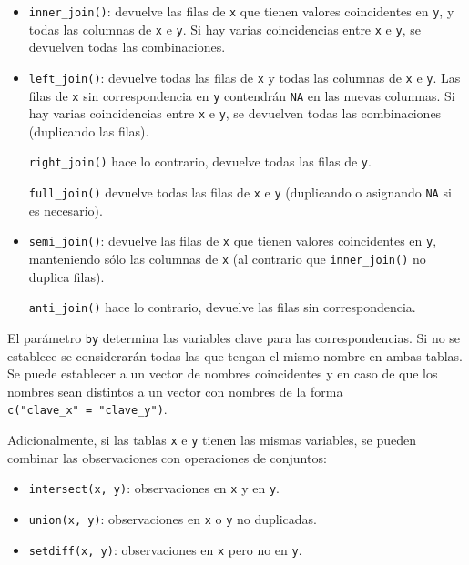 \documentclass[
]{book}
\begin{document}
\begin{itemize}
\item
  \texttt{inner\_join()}: devuelve las filas de \texttt{x} que tienen valores coincidentes en \texttt{y},
  y todas las columnas de \texttt{x} e \texttt{y}. Si hay varias coincidencias entre \texttt{x} e \texttt{y},
  se devuelven todas las combinaciones.
\item
  \texttt{left\_join()}: devuelve todas las filas de \texttt{x} y todas las columnas de \texttt{x} e \texttt{y}.
  Las filas de \texttt{x} sin correspondencia en \texttt{y} contendrán \texttt{NA} en las nuevas columnas.
  Si hay varias coincidencias entre \texttt{x} e \texttt{y}, se devuelven todas las combinaciones
  (duplicando las filas).

  \texttt{right\_join()} hace lo contrario, devuelve todas las filas de \texttt{y}.

  \texttt{full\_join()} devuelve todas las filas de \texttt{x} e \texttt{y} (duplicando o asignando \texttt{NA} si es necesario).
\item
  \texttt{semi\_join()}: devuelve las filas de \texttt{x} que tienen valores coincidentes en \texttt{y},
  manteniendo sólo las columnas de \texttt{x} (al contrario que \texttt{inner\_join()} no duplica filas).

  \texttt{anti\_join()} hace lo contrario, devuelve las filas sin correspondencia.
\end{itemize}

El parámetro \texttt{by} determina las variables clave para las correspondencias.
Si no se establece se considerarán todas las que tengan el mismo nombre en ambas tablas.
Se puede establecer a un vector de nombres coincidentes y en caso de que los nombres sean distintos a un vector con nombres de la forma \texttt{c("clave\_x"\ =\ "clave\_y")}.

Adicionalmente, si las tablas \texttt{x} e \texttt{y} tienen las mismas variables, se pueden combinar las observaciones con operaciones de conjuntos:

\begin{itemize}
\item
  \texttt{intersect(x,\ y)}: observaciones en \texttt{x} y en \texttt{y}.
\item
  \texttt{union(x,\ y)}: observaciones en \texttt{x} o \texttt{y} no duplicadas.
\item
  \texttt{setdiff(x,\ y)}: observaciones en \texttt{x} pero no en \texttt{y}.
\end{itemize}
\end{document}
